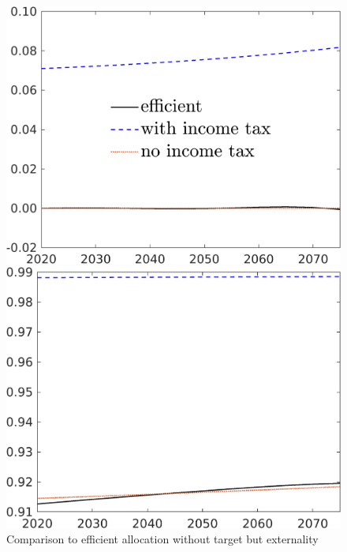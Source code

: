 \begin{figure}[h!!]
	\centering
	\caption{Comparison to efficient allocation without target but externality }\label{fig:Compno_eff_extern}
	\begin{minipage}[]{0.32\textwidth}
		\includegraphics[width=1\textwidth]{../../codding_model/own_basedOnFried/optimalPol_elastS_DisuSci/figures/all_1705/Extern_CompEff_taul_spillover0_noskill0_sep1_BN0_ineq0_red0_etaa0.79_lgd1.png}
	\end{minipage}
	\begin{minipage}[]{0.32\textwidth}
		\includegraphics[width=1\textwidth]{../../codding_model/own_basedOnFried/optimalPol_elastS_DisuSci/figures/all_1705/Extern_CompEff_tauf_spillover0_noskill0_sep1_BN0_ineq0_red0_etaa0.79_lgd0.png}

\end{minipage}
\end{figure}
